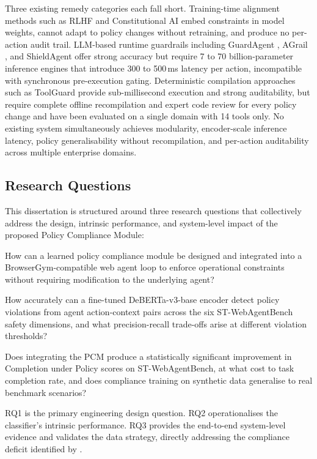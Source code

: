 \documentclass[12pt,a4paper]{article}
\begin{document}
Three existing remedy categories each fall short. Training-time alignment methods such as RLHF \citep{ouyang2022training} and Constitutional AI \citep{bai2022constitutional} embed constraints in model weights, cannot adapt to policy changes without retraining, and produce no per-action audit trail. LLM-based runtime guardrails including GuardAgent \citep{xiang2024guardagent}, AGrail \citep{luo2025agrail}, and ShieldAgent \citep{chen2025shieldagent} offer strong accuracy but require 7 to 70 billion-parameter inference engines that introduce 300 to 500\,ms latency per action, incompatible with synchronous pre-execution gating. Deterministic compilation approaches such as ToolGuard \citep{zwerdling2025toolguard} provide sub-millisecond execution and strong auditability, but require complete offline recompilation and expert code review for every policy change and have been evaluated on a single domain with 14 tools only. No existing system simultaneously achieves modularity, encoder-scale inference latency, policy generalisability without recompilation, and per-action auditability across multiple enterprise domains.

\subsection{Research Questions}
\label{sec:rq}

This dissertation is structured around three research questions that collectively
address the design, intrinsic performance, and system-level impact of the
proposed Policy Compliance Module:

\begin{description}[leftmargin=2em,labelindent=0.5em]
  \item[RQ1 (Design):] How can a learned policy compliance module be designed and integrated into a BrowserGym-compatible web agent loop to enforce operational constraints without requiring modification to the underlying agent?
  \item[RQ2 (Classifier Performance):] How accurately can a fine-tuned DeBERTa-v3-base encoder detect policy violations from agent action-context pairs across the six ST-WebAgentBench safety dimensions, and what precision-recall trade-offs arise at different violation thresholds?
  \item[RQ3 (System Evaluation):] Does integrating the PCM produce a statistically significant improvement in Completion under Policy scores on ST-WebAgentBench, at what cost to task completion rate, and does compliance training on synthetic data generalise to real benchmark scenarios?
\end{description}
RQ1 is the primary engineering design question. RQ2 operationalises 
the classifier's intrinsic performance. RQ3 provides the end-to-end 
system-level evidence and validates the data strategy, directly 
addressing the compliance deficit identified by 
\citet{levy2026stwebagentbench}.
\end{document}

